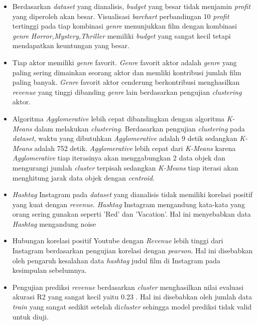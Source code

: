 \begin{itemize}
\item Berdasarkan \textit{dataset} yang dianalisis, \textit{budget} yang besar tidak menjamin \textit{profit} yang diperoleh akan besar. Visualisasi \textit{barchart} perbandingan 10 \textit{profit} tertinggi pada tiap kombinasi \textit{genre}  menunjukkan film dengan kombinasi \textit{genre} \textit{Horror,Mystery,Thriller} memiliki \textit{budget} yang sangat kecil tetapi mendapatkan keuntungan yang besar.  


\item Tiap aktor memiliki \textit{genre} favorit. \textit{Genre} favorit aktor adalah \textit{genre} yang paling sering dimainkan seorang aktor dan memliki kontribusi jumlah film paling banyak. \textit{Genre} favorit aktor cenderung berkontribusi menghasilkan \textit{revenue} yang tinggi dibanding \textit{genre} lain berdasarkan pengujian \textit{clustering} aktor. 

\item Algoritma \textit{Agglomerative} lebih cepat dibandingkan dengan algoritma \textit{K-Means} dalam melakukan \textit{clustering}. Berdasarkan pengujian \textit{clustering} pada \textit{dataset}, waktu yang dibutuhkan \textit{Agglomerative} adalah 9 detik sedangkan \textit{K-Means} adalah 752 detik. \textit{Agglomerative} lebih cepat dari \textit{K-Means} karena \textit{Agglomerative} tiap iterasinya akan menggabungkan 2 data objek dan mengurangi jumlah \textit{cluster} terpisah sedangkan \textit{K-Means} tiap iterasi akan menghitung jarak data objek dengan \textit{centroid}. 

\item \textit{Hashtag} Instagram pada \textit{dataset} yang dianalisis tidak memiliki korelasi positif yang kuat dengan \textit{revenue}. \textit{Hashtag} Instagram mengandung kata-kata yang orang sering gunakan seperti 'Red' dan 'Vacation'. Hal ini menyebabkan data \textit{Hashtag} mengandung noise  

\item Hubungan korelasi positif Youtube dengan \textit{Revenue} lebih tinggi dari Instagram berdasarkan pengujian korelasi dengan \textit{pearson}. Hal ini disebabkan oleh pengaruh kesalahan data \textit{hashtag} judul film di Instagram pada kesimpulan sebelumnya.

\item Pengujian prediksi \textit{revenue} berdasarkan \textit{cluster}  menghasilkan nilai evaluasi akurasi R2 yang sangat kecil yaitu 0.23 . Hal ini disebabkan oleh jumlah data \textit{train} yang sangat sedikit setelah di\textit{cluster} sehingga model prediksi tidak valid untuk diuji.

 
\end{itemize}


